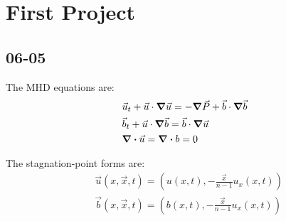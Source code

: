\documentclass[11pt]{report}
\begin{document}
\chapter*{First Project}
	\section*{06-05}
		\begin{definition}
		\label{mhd-eqns}
			The MHD equations are:
			\begin{align*}
				&\vec{u}_t + \vec{u} \cdot \grad \vec{u} =
					-\grad \vec{P} + \vec{b} \cdot \grad \vec{b} \\
				&\vec{b}_t + \vec{u} \cdot \grad \vec{b} =
					\vec{b} \cdot \grad \vec{u} \\
				&\div{\vec{u}} = \div{b} = 0
			\end{align*}
		\end{definition}

		\begin{definition}
		\label{stag-point}
			The stagnation-point forms are:
			\begin{align*}
				&\vec{u}(x, \vec{x}, t) =
					(u(x, t), -\frac{\vec{x}}{n - 1} u_x(x, t)) \\
				&\vec{b}(x, \vec{x}, t) =
					(b(x, t), -\frac{\vec{x}}{n - 1} u_x(x, t)) 	
			\end{align*}
		\end{definition}
		
\end{document}
